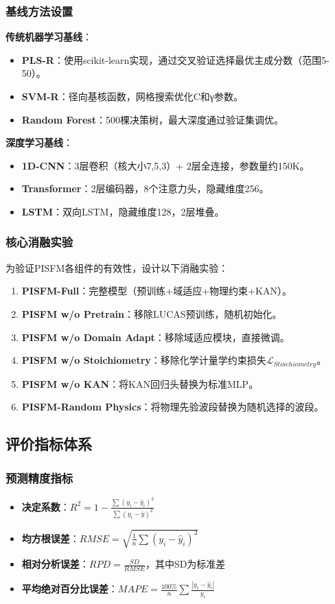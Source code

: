 \documentclass[12pt, a4paper]{article}
\begin{document}
\subsubsection{基线方法设置}
\textbf{传统机器学习基线}：
\begin{itemize}
    \item \textbf{PLS-R}：使用scikit-learn实现，通过交叉验证选择最优主成分数（范围5-50）。
    \item \textbf{SVM-R}：径向基核函数，网格搜索优化C和γ参数。
    \item \textbf{Random Forest}：500棵决策树，最大深度通过验证集调优。
\end{itemize}

\textbf{深度学习基线}：
\begin{itemize}
    \item \textbf{1D-CNN}：3层卷积（核大小7,5,3）+ 2层全连接，参数量约150K。
    \item \textbf{Transformer}：2层编码器，8个注意力头，隐藏维度256。
    \item \textbf{LSTM}：双向LSTM，隐藏维度128，2层堆叠。
\end{itemize}

\subsubsection{核心消融实验}
为验证PISFM各组件的有效性，设计以下消融实验：
\begin{enumerate}
    \item \textbf{PISFM-Full}：完整模型（预训练+域适应+物理约束+KAN）。
    \item \textbf{PISFM w/o Pretrain}：移除LUCAS预训练，随机初始化。
    \item \textbf{PISFM w/o Domain Adapt}：移除域适应模块，直接微调。
    \item \textbf{PISFM w/o Stoichiometry}：移除化学计量学约束损失$\mathcal{L}_{Stoichiometry}$。
    \item \textbf{PISFM w/o KAN}：将KAN回归头替换为标准MLP。
    \item \textbf{PISFM-Random Physics}：将物理先验波段替换为随机选择的波段。
\end{enumerate}

\subsection{评价指标体系}

\subsubsection{预测精度指标}
\begin{itemize}
    \item \textbf{决定系数}：$R^2 = 1 - \frac{\sum(y_i - \hat{y}_i)^2}{\sum(y_i - \bar{y})^2}$
    \item \textbf{均方根误差}：$RMSE = \sqrt{\frac{1}{n}\sum(y_i - \hat{y}_i)^2}$
    \item \textbf{相对分析误差}：$RPD = \frac{SD}{RMSE}$，其中SD为标准差
    \item \textbf{平均绝对百分比误差}：$MAPE = \frac{100\%}{n}\sum\frac{|y_i - \hat{y}_i|}{y_i}$
\end{itemize}
\end{document}
